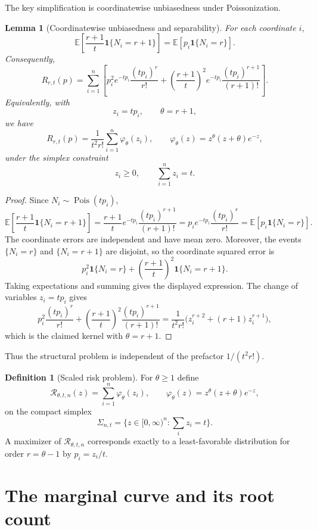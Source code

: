 \documentclass[11pt]{article}
\newtheorem{lemma}[theorem]{Lemma}
\theoremstyle{definition}
\newtheorem{definition}[theorem]{Definition}
\newcommand{\E}{\mathbb E}
\newcommand{\one}{\mathbf 1}
\newcommand{\Pois}{\operatorname{Pois}}
\begin{document}
The key simplification is coordinatewise unbiasedness under Poissonization.

\begin{lemma}[Coordinatewise unbiasedness and separability]\label{lem:risk-separable}
For each coordinate $i$,
\[
  \E\left[\frac{r+1}{t}\one\{N_i=r+1\}\right]
  =\E\left[p_i\one\{N_i=r\}\right].
\]
Consequently,
\[
  R_{r,t}(p)
  =\sum_{i=1}^n
  \left[
  p_i^2 e^{-t p_i}\frac{(t p_i)^r}{r!}
  +\left(\frac{r+1}{t}\right)^2
  e^{-t p_i}\frac{(t p_i)^{r+1}}{(r+1)!}
  \right].
\]
Equivalently, with
\[
  z_i=t p_i,
  \qquad \theta=r+1,
\]
we have
\[
  R_{r,t}(p)=\frac{1}{t^2 r!}
  \sum_{i=1}^n \varphi_\theta(z_i),
  \qquad
  \varphi_\theta(z)=z^\theta(z+\theta)e^{-z},
\]
under the simplex constraint
\[
  z_i\ge0,
  \qquad \sum_{i=1}^n z_i=t.
\]
\end{lemma}

\begin{proof}
Since $N_i\sim\Pois(t p_i)$,
\[
  \E\left[\frac{r+1}{t}\one\{N_i=r+1\}\right]
  =\frac{r+1}{t}e^{-t p_i}\frac{(t p_i)^{r+1}}{(r+1)!}
  =p_i e^{-t p_i}\frac{(t p_i)^r}{r!}
  =\E\left[p_i\one\{N_i=r\}\right].
\]
The coordinate errors are independent and have mean zero.  Moreover, the events $\{N_i=r\}$ and $\{N_i=r+1\}$ are disjoint, so the coordinate squared error is
\[
  p_i^2\one\{N_i=r\}
  +\left(\frac{r+1}{t}\right)^2\one\{N_i=r+1\}.
\]
Taking expectations and summing gives the displayed expression.  The change of variables $z_i=t p_i$ gives
\[
  p_i^2\frac{(t p_i)^r}{r!}
  +\left(\frac{r+1}{t}\right)^2\frac{(t p_i)^{r+1}}{(r+1)!}
  =\frac{1}{t^2r!}\bigl(z_i^{r+2}+(r+1)z_i^{r+1}\bigr),
\]
which is the claimed kernel with $\theta=r+1$.
\end{proof}

Thus the structural problem is independent of the prefactor $1/(t^2r!)$.

\begin{definition}[Scaled risk problem]\label{def:scaled}
For $\theta\ge1$ define
\[
  \mathcal R_{\theta,t,n}(z)=\sum_{i=1}^n\varphi_\theta(z_i),
  \qquad
  \varphi_\theta(z)=z^\theta(z+\theta)e^{-z},
\]
on the compact simplex
\[
  \Sigma_{n,t}=\{z\in[0,\infty)^n:\sum_i z_i=t\}.
\]
A maximizer of $\mathcal R_{\theta,t,n}$ corresponds exactly to a least-favorable distribution for order $r=\theta-1$ by $p_i=z_i/t$.
\end{definition}

\section{The marginal curve and its root count}\label{sec:marginal}
\end{document}
